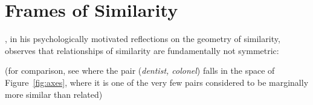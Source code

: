 \section{Frames of Similarity}
\cite{Tversky1977}, in his psychologically motivated reflections on the geometry of similarity, observes that relationships of similarity are fundamentally not symmetric: 

(for comparison, see where the pair (\emph{dentist, colonel}) falls in the space of Figure~\ref{fig:axes}, where it is one of the very few pairs considered to be marginally more similar than related)
